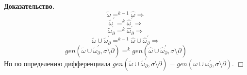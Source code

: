 \textbf{Доказательство.}
$$\tilde{\omega} =^{k-1} \hat{\omega} \Rightarrow$$
$$\tilde{\omega}^\prime =^{k} \hat{\omega}^\prime \Rightarrow$$
$$\tilde{\omega}^\prime_\partial =^{k} \hat{\omega}^\prime_\partial \Rightarrow$$
$$\tilde{\omega} \cup \tilde{\omega}^\prime_\partial =^{k-1} \hat{\omega} \cup \hat{\omega}^\prime_\partial \Rightarrow$$
$$gen(\tilde{\omega} \cup \tilde{\omega}^\prime_\partial, \sigma\setminus\partial) =^{k} gen(\hat{\omega} \cup \hat{\omega}^\prime_\partial, \sigma\setminus\partial)$$
Но по определению дифференциала $gen(\tilde{\omega} \cup \tilde{\omega}^\prime_\partial, \sigma\setminus\partial) = gen(\omega \cup \omega^\prime_{\partial}, \sigma\setminus\partial)$. $\Box$\\

\begin{comment}
	Вопрос: верно ли, что в условиях инкрементального случая (там, где $\Delta^\rho_\alpha\sigma$)

	$$\partial\dfrac{\omega_\rho}{\omega_\alpha}(\sigma\setminus\rho)\subseteq\xi$$ ?

	\textbf{Доказательство:}

	\newcommand{\mypart}{\partial\dfrac{\omega_\rho}{\omega_\alpha}(\sigma\setminus\rho)}

	Докажем, что если $s \in \sigma\setminus\rho$, $s \notin \xi$, то $s \notin \mypart$. Обозначим $\tau = (\sigma\setminus\rho)\setminus\mypart$, тогда $\tau$ --- наибольшее подмножество $\sigma\setminus\rho$, такое, что $gen(\omega_\rho, \tau)$ определено $\Leftrightarrow$ $gen(\omega_\alpha, \tau)$ определено. Предположим, $s \in \mypart$, тогда $s \notin \tau$. Рассмотрим $gen(\omega_\rho, \tau)$.
\end{comment}
